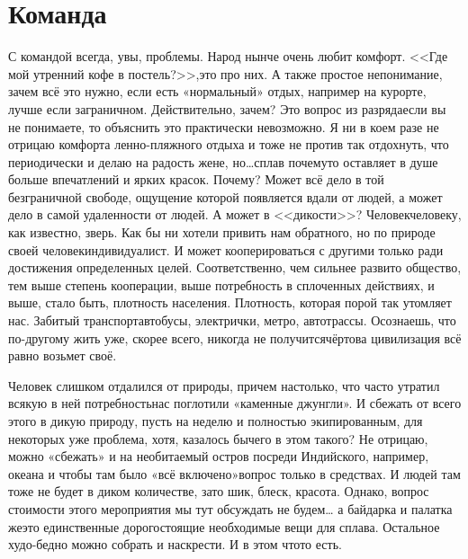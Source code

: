 \chapter{Команда} 

С командой всегда, увы, проблемы. Народ нынче очень любит комфорт. <<Где мой утренний кофе в постель?>>,\mdash это про них. А также простое непонимание, зачем всё это нужно, если есть «нормальный» отдых, например на курорте, лучше если заграничном. Действительно, зачем? Это вопрос из разряда\mdash если вы не понимаете, то объяснить это практически невозможно. Я ни в коем разе не отрицаю комфорта ленно-пляжного отдыха и тоже не против так отдохнуть, что периодически и делаю на радость жене, но\ldots сплав почему\sdash то оставляет в душе больше впечатлений и ярких красок. Почему? Может всё дело в той безграничной свободе, ощущение которой появляется вдали от людей, а может дело в самой удаленности от людей. А может в <<дикости>>? Человек\ndash человеку, как известно, зверь. Как бы ни хотели привить нам обратного, но по природе своей человек\mdash индивидуалист. И может кооперироваться с другими только ради достижения определенных целей. Соответственно, чем сильнее развито общество, тем выше степень кооперации, выше потребность в сплоченных действиях, и выше, стало быть, плотность населения. Плотность, которая порой так утомляет нас. Забитый транспорт\mdash автобусы, электрички, метро, автотрассы. Осознаешь, что по-другому жить уже, скорее всего, никогда не получится\mdash чёртова цивилизация всё равно возьмет своё. ­

Человек слишком отдалился от природы, причем настолько, что часто утратил всякую в ней потребность\mdash нас поглотили «каменные джунгли». И сбежать от всего этого в дикую природу, пусть на неделю и полностью экипированным, для некоторых уже проблема, хотя, казалось бы\mdash чего в этом такого? Не отрицаю, можно «сбежать» и на необитаемый остров посреди Индийского, например, океана и чтобы там было «всё включено»\mdash вопрос только в средствах. И людей там тоже не будет в диком количестве, зато шик, блеск, красота. Однако, вопрос стоимости этого мероприятия мы тут обсуждать не будем… а байдарка и палатка же\mdash это единственные дорогостоящие необходимые вещи для сплава. Остальное худо-бедно можно собрать и наскрести. И в этом что\sdash то есть. 

